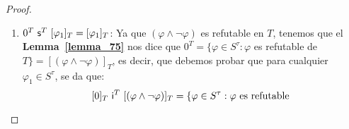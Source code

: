 \begin{proof}
\begin{enumerate}[(1)]
      \item $0^{T} \ \mathsf{s}^{T} \ [\varphi_{1}]_{T} = [\varphi_{1}]_{T}$: Ya que $(\varphi \wedge \lnot\varphi)$ es
        refutable en $T$, tenemos que el \textbf{Lemma~\ref{lemma_75}} nos dice que $0^{T} =
        \{\varphi \in S^{\tau}: \varphi$ es refutable de $T\} = [(\varphi \wedge \lnot\varphi)]_{T}$, es decir,
        que debemos probar que para cualquier $\varphi_{1} \in S^{\tau}$, se da que:
        \[
          [0]_{T} \ \mathsf{i}^{T} \ [(\varphi \wedge \lnot\varphi)]_{T} = \{\varphi \in S^{\tau}: \varphi \ \text{es refutable
}\]
\end{enumerate}
\end{proof}
